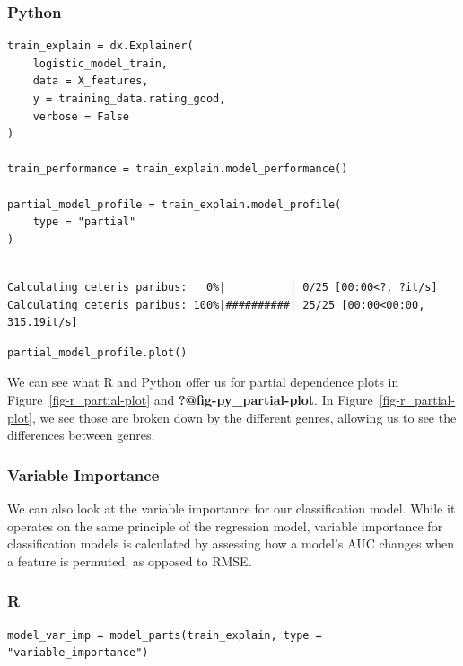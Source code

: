 \documentclass[
  letterpaper,
]{krantz}
\begin{document}
\subsubsection{Python}

\begin{verbatim}
train_explain = dx.Explainer(
    logistic_model_train, 
    data = X_features, 
    y = training_data.rating_good, 
    verbose = False
)

train_performance = train_explain.model_performance()

partial_model_profile = train_explain.model_profile(
    type = "partial"
)
\end{verbatim}

\begin{verbatim}

Calculating ceteris paribus:   0%|          | 0/25 [00:00<?, ?it/s]
Calculating ceteris paribus: 100%|##########| 25/25 [00:00<00:00, 315.19it/s]
\end{verbatim}

\begin{verbatim}
partial_model_profile.plot()
\end{verbatim}

We can see what R and Python offer us for partial dependence plots in
Figure~\ref{fig-r_partial-plot} and \textbf{?@fig-py\_partial-plot}. In
Figure~\ref{fig-r_partial-plot}, we see those are broken down by the
different genres, allowing us to see the differences between genres.

\subsubsection{Variable Importance}\label{variable-importance-1}

We can also look at the variable importance for our classification
model. While it operates on the same principle of the regression model,
variable importance for classification models is calculated by assessing
how a model's AUC changes when a feature is permuted, as opposed to
RMSE.

\subsubsection{R}

\begin{verbatim}
model_var_imp = model_parts(train_explain, type = "variable_importance")
\end{verbatim}
\end{document}
